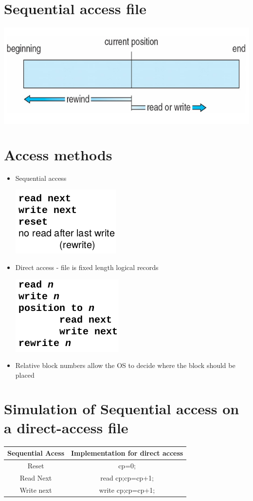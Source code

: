 \documentclass{article}[18pt]
\begin{document}
\section{Sequential access file}
\begin{center}
	\includegraphics[scale=0.7]{sa}
\end{center}
\section{Access methods}
\begin{itemize}
	\item Sequential access
	\begin{center}
		\includegraphics[scale=0.7]{sequential}
	\end{center}
	\item Direct access - file is fixed length logical records
	\begin{center}
		\includegraphics[scale=0.7]{direct}
	\end{center}
	\item Relative block numbers allow the OS to decide where the block should be placed
\end{itemize}
\section{Simulation of Sequential access on a direct-access file}
\begin{tabular}{|c|c|}
	\hline 
	Sequential Acess & Implementation for direct access \\ 
	\hline 
	Reset & cp=0; \\ 
	\hline 
	Read Next & read cp;\newline cp=cp+1; \\ 
	\hline 
	Write next & write cp;\newline cp=cp+1; \\ 
	\hline 
\end{tabular} 
\end{document}
